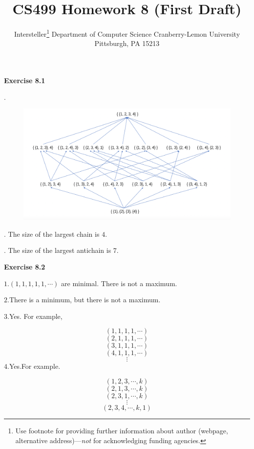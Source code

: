\documentclass{article} %
\title{CS499 Homework 8 (First Draft)}
\author{
	Intersteller\thanks{ Use footnote for providing further information
		about author (webpage, alternative address)---\emph{not} for acknowledging
		funding agencies.}
	Department of Computer Science
	Cranberry-Lemon University
	Pittsburgh, PA 15213
}
\begin{document}
	\maketitle
	\textbf{Exercise 8.1}\par
	.\par
  	\begin{figure}[H]
  	\centering
  	\includegraphics[scale=0.5]{8_1.png}
  	\caption{}
  	\label{}
  	\end{figure}
	. The size of the largest chain is $4$.\par
	 . The size of the largest antichain is $7$.\par
	
	\textbf{Exercise 8.2}\par
    $1.(1,1,1,1,1,\cdots)$ are minimal. There is not a maximum.\par
    $2.$There is a minimum, but there is not a maximum.\par
    $3.$Yes. For example,\par
    $$(1,1,1,1,\cdots)$$
    $$(2,1,1,1,\cdots)$$
    $$(3,1,1,1,\cdots)$$
    $$(4,1,1,1,\cdots)$$
    $$\vdots$$
    $4.$Yes.For example.\par
    $$(1,2,3,\cdots,k)$$
    $$(2,1,3,\cdots,k)$$
    $$(2,3,1,\cdots,k)$$
    $$\vdots$$
    $$(2,3,4,\cdots,k,1)$$
\end{document}
